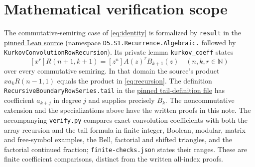 \documentclass[11pt]{article}
\newcommand{\N}{\mathbb{N}}
\begin{document}
\section{Mathematical verification scope}
The commutative-semiring case of \eqref{eq:identity} is formalized by
\texttt{result} in the
\href{https://github.com/the-omega-institute/trureturing/blob/03150b25ffad5ced1bebdca2efc8c05b484c1eca/D5/S1/Recurrence/Algebraic/KurkovConvolutionRowRecursion.lean}{pinned Lean source}
(namespace \texttt{D5.S1.Recurrence.Algebraic.} followed by
\texttt{KurkovConvolutionRowRecursion}). Its private lemma
\texttt{kurkov\_coeff} states
\[
 [x^r]R(n+1,k+1)=[z^n]A(z)^rB_{k+1}(z)
 \quad(n,k,r\in\N)
\]
over every commutative semiring. In that domain the source's product
$x a_kR(n-1,1)$ equals the product in \eqref{eq:recursion}.
The definition \texttt{RecursiveBoundaryRowSeries.tail} in the
\href{https://github.com/the-omega-institute/trureturing/blob/03150b25ffad5ced1bebdca2efc8c05b484c1eca/D5/S1/Recurrence/Algebraic/RecursiveBoundaryRowSeries.lean}{pinned tail-definition file}
has coefficient $a_{k+j}$ in degree $j$ and supplies precisely $B_k$.
The noncommutative extension and the specializations above have the
written proofs in this note. The accompanying \texttt{verify.py}
compares exact convolution coefficients with both the array recursion
and the tail formula in finite integer, Boolean, modular, matrix and
free-symbol examples, the Bell, factorial and shifted triangles, and
the factorial continued fraction; \texttt{finite-checks.json} states
their ranges. These are finite coefficient comparisons, distinct from
the written all-index proofs.
\end{document}
